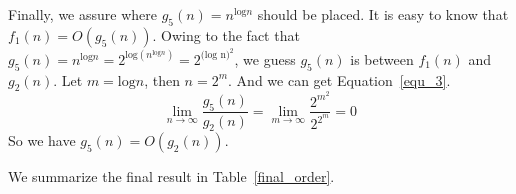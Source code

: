 {Finally, we assure where $g_5(n)=n^{\textrm{log} n}$ should be placed. It is easy to know that $f_1(n)=O(g_5(n))$. Owing to the fact that $g_5(n)=n^{\textrm{log} n}=2^{\textrm{log} (n^{\textrm{log} n})}=2^{{\textrm{(log n)}^2}}$, we guess $g_5(n)$ is between $f_1(n)$ and $g_2(n)$. Let $m=\textrm{log} n$, then $n=2^m$. And we can get Equation~\ref{equ_3}.
\begin{equation}\label{equ_3}
  \lim\limits_{n \to \infty} \frac{g_5(n)}{g_2(n)}  = \lim\limits_{m \to \infty} \frac{2^{m^2}}{2^{2^m}} = 0
\end{equation}
So we have $g_5(n)=O(g_2(n))$. 

We summarize the final result in Table~\ref{final_order}.
\begin{table}[H]
\caption{Rank of functions}
\label{final_order}
\centering
{}
\end{table}

}
